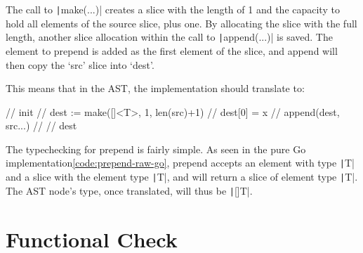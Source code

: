 The call to \texttt|make(...)| creates a slice with the length of 1 and the capacity
to hold all elements of the source slice, plus one. By allocating the slice with the full
length, another slice allocation within the call to \texttt|append(...)| is saved.
The element to prepend is added as the first element of the slice, and append will then
copy the `src' slice into `dest'.

This means that in the AST, the implementation should translate to:
\begin{code}
\begin{gocode}
//   init {
//     dest := make([]<T>, 1, len(src)+1)
//     dest[0] = x
//     append(dest, src...)
//   }
//   dest
\end{gocode}
\end{code}

The typechecking for prepend is fairly simple. As seen in the pure Go implementation\ref{code:prepend-raw-go},
prepend accepts an element with type \texttt|T| and a slice with the element type \texttt|T|,
and will return a slice of element type \texttt|T|. The AST node's type, once translated,
will thus be \texttt|[]T|.

\section{Functional Check}
